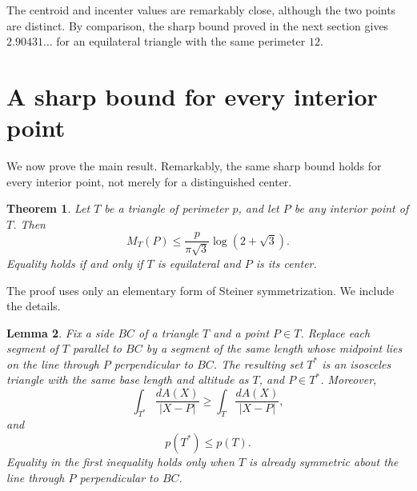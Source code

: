\documentclass[11pt]{article}
\newtheorem{theorem}{Theorem}[section]
\newtheorem{lemma}[theorem]{Lemma}
\theoremstyle{remark}
\begin{document}
The centroid and incenter values are remarkably close, although the
two points are distinct.  By comparison, the sharp bound proved in
the next section gives $2.90431\ldots$ for an equilateral triangle
with the same perimeter $12$.

\section{A sharp bound for every interior point}

We now prove the main result.  Remarkably, the same sharp bound holds
for every interior point, not merely for a distinguished center.

\begin{theorem}\label{thm:main}
Let $T$ be a triangle of perimeter $p$, and let $P$ be any interior
point of $T$.  Then
\[
 {
 M_T(P)\le
 \frac{p}{\pi\sqrt3}\log(2+\sqrt3).
 }
\]
Equality holds if and only if $T$ is equilateral and $P$ is its
center.
\end{theorem}

The proof uses only an elementary form of Steiner symmetrization.  We
include the details.

\begin{lemma}\label{lem:symm}
Fix a side $BC$ of a triangle $T$ and a point $P\in T$.  Replace
each segment of $T$ parallel to $BC$ by a segment of the same length
whose midpoint lies on the line through $P$ perpendicular to $BC$.
The resulting set $T^*$ is an isosceles triangle with the same base
length and altitude as $T$, and $P\in T^*$.  Moreover,
\[
 \int_{T^*}\frac{dA(X)}{|X-P|}
 \ge
 \int_T\frac{dA(X)}{|X-P|},
\]
and
\[
 p(T^*)\le p(T).
\]
Equality in the first inequality holds only when $T$ is already
symmetric about the line through $P$ perpendicular to $BC$.
\end{lemma}
\end{document}
